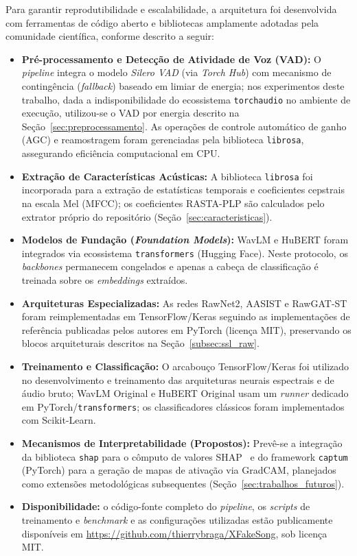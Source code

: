 \documentclass[12pt,a4paper]{article}
\begin{document}
Para garantir reprodutibilidade e escalabilidade, a arquitetura foi
desenvolvida com ferramentas de código aberto e bibliotecas amplamente adotadas
pela comunidade científica, conforme descrito a seguir:

\begin{itemize}
    \item \textbf{Pré-processamento e Detecção de Atividade de Voz (VAD):} O \textit{pipeline} integra o modelo \textit{Silero VAD} (via \textit{Torch Hub}) com mecanismo de contingência (\textit{fallback}) baseado em limiar de energia; nos experimentos deste trabalho, dada a indisponibilidade do ecossistema \texttt{torchaudio} no ambiente de execução, utilizou-se o VAD por energia descrito na Seção~\ref{sec:preprocessamento}. As operações de controle automático de ganho (AGC) e reamostragem foram gerenciadas pela biblioteca \texttt{librosa}, assegurando eficiência computacional em CPU.
    \item \textbf{Extração de Características Acústicas:} A biblioteca \texttt{librosa} foi incorporada para a extração de estatísticas temporais e coeficientes cepstrais na escala Mel (MFCC); os coeficientes RASTA-PLP são calculados pelo extrator próprio do repositório (Seção~\ref{sec:caracteristicas}).
    \item \textbf{Modelos de Fundação (\textit{Foundation Models}):} WavLM e HuBERT foram integrados via ecossistema \texttt{transformers} (Hugging Face). Neste protocolo, os \textit{backbones} permanecem congelados e apenas a cabeça de classificação é treinada sobre os \textit{embeddings} extraídos.
    \item \textbf{Arquiteturas Especializadas:} As redes RawNet2, AASIST e RawGAT-ST foram reimplementadas em TensorFlow/Keras seguindo as implementações de referência publicadas pelos autores em PyTorch (licença MIT), preservando os blocos arquiteturais descritos na Seção~\ref{subsec:ssl_raw}.
    \item \textbf{Treinamento e Classificação:} O arcabouço TensorFlow/Keras foi utilizado no desenvolvimento e treinamento das arquiteturas neurais espectrais e de áudio bruto; WavLM Original e HuBERT Original usam um \textit{runner} dedicado em PyTorch/\texttt{transformers}; os classificadores clássicos foram implementados com Scikit-Learn.
    \item \textbf{Mecanismos de Interpretabilidade (Propostos):} Prevê-se a integração da biblioteca \texttt{shap} para o cômputo de valores SHAP~\cite{lundberg2017unified} e do framework \texttt{captum} (PyTorch) para a geração de mapas de ativação via GradCAM, planejados como extensões metodológicas subsequentes (Seção~\ref{sec:trabalhos_futuros}).
    \item \textbf{Disponibilidade:} o código-fonte completo do \textit{pipeline}, os \textit{scripts} de treinamento e \textit{benchmark} e as configurações utilizadas estão publicamente disponíveis em \url{https://github.com/thierrybraga/XFakeSong}, sob licença MIT.
\end{itemize}
\end{document}
